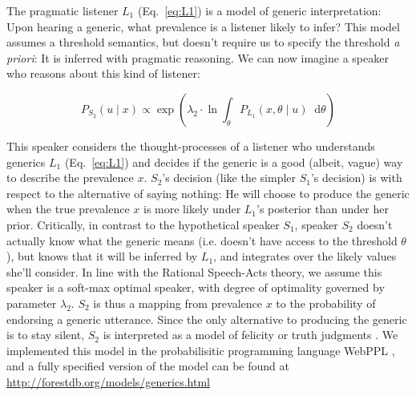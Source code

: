 \documentclass[12pt,letterpaper]{article}
\newcommand*\diff{\mathop{}\!\mathrm{d}}
\begin{document}
The pragmatic listener $L_1$ (Eq.~\ref{eq:L1}) is a model of generic interpretation: Upon hearing a generic, what prevalence is a listener likely to infer?
This model assumes a threshold semantics, but doesn't require us to specify the threshold \emph{a priori}: It is inferred with pragmatic reasoning.
We can now imagine a speaker who reasons about this kind of listener:

\begin{equation} 
P_{S_{2}}(u \mid x) \propto  \exp{(\lambda_2 \cdot \ln \int_{\theta} P_{L_{1}}(x , \theta \mid u) \diff \theta ) }%
\label{eq:S2}
\end{equation}

This speaker considers the thought-processes of a listener who understands generics $L_1$ (Eq.~\ref{eq:L1}) and decides if the generic is a good (albeit, vague) way to describe the  prevalence $x$. 
$S_2$'s decision (like the simpler $S_1$'s decision) is with respect to the alternative of saying nothing: He will choose to produce the generic when the true prevalence $x$ is more likely under $L_1$'s posterior than under her prior. 
Critically, in contrast to the hypothetical speaker $S_1$, speaker $S_{2}$ doesn't actually know what the generic means (i.e. doesn't have access to the threshold $\theta$), but knows that it will be inferred by $L_{1}$, and integrates over the likely values she'll consider.
In line with the Rational Speech-Acts theory, we assume this speaker is a soft-max optimal speaker, with degree of optimality governed by parameter $\lambda_2$.
$S_2$ is thus a mapping from prevalence $x$ to the probability of endorsing a generic utterance. 
Since the only alternative to producing the generic is to stay silent, $S_2$ is interpreted as a model of felicity or truth judgments \cite{Degen2014}.
We implemented this model in the probabilisitic programming language WebPPL \cite{dippl}, and a fully specified version of the model can be found at \url{http://forestdb.org/models/generics.html}
\end{document}

